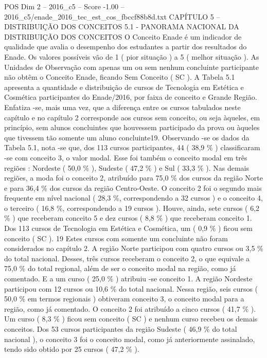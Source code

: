 \begin{textsample}{POS Dim 2 – 2016\_c5 – Score -1.00 – 2016\_c5/enade\_2016\_tec\_est\_cos\_fbccf88b8d.txt}  \label{ex:f2_pos_396}
CAPÍTULO 5 – DISTRIBUIÇÃO DOS CONCEITOS 5.1 - PANORAMA NACIONAL DA DISTRIBUIÇÃO DOS CONCEITOS O Conceito Enade é um indicador de qualidade que avalia o desempenho dos estudantes a partir dos resultados do Enade.
Os valores possíveis vão de 1 ( pior situação ) a 5 ( melhor situação ).
As Unidades de Observação com apenas um ou sem nenhum concluinte participante não obtêm o Conceito Enade, ficando Sem Conceito ( SC ).
A Tabela 5.1 apresenta a quantidade e distribuição de cursos de Tecnologia em Estética e Cosmética participantes do Enade/2016, por faixa de conceito e Grande Região.
Enfatiza -se, mais uma vez, que a diferença entre os cursos tabulados neste capítulo e no capítulo 2 corresponde aos cursos sem conceito, ou seja àqueles, em princípio, sem alunos concluintes que houvessem participado da prova ou àqueles que tivessem tão somente um aluno concluinte19.
Observando -se os dados da Tabela 5.1, nota -se que, dos 113 cursos participantes, 44 ( 38,9 \% ) classificaram -se com conceito 3, o valor modal.
Esse foi também o conceito modal em três regiões : Nordeste ( 50,0 \% ), Sudeste ( 47,2 \% ) e Sul ( 33,3 \% ).
Nas demais regiões, a moda foi o conceito 2, atribuído para 75,0 \% dos cursos da região Norte e para 36,4 \% dos cursos da região Centro-Oeste.
O conceito 2 foi o segundo mais frequente em nível nacional ( 28,3 \%, correspondendo a 32 cursos ) e o conceito 4, o terceiro ( 16,8 \%, correspondendo a 19 cursos ).
Houve, ainda, sete cursos ( 6,2 \% ) que receberam conceito 5 e dez cursos ( 8,8 \% ) que receberam conceito 1.
Dos 113 cursos de Tecnologia em Estética e Cosmética, um ( 0,9 \% ) ficou sem conceito ( SC ). 19 Estes cursos com somente um concluinte não foram considerados no capítulo 2.
A região Norte participou com quatro cursos ou 3,5 \% do total nacional.
Desses, três cursos receberam o conceito 2, o que equivale a 75,0 \% do total regional, além de ser o conceito modal na região, como já comentado.
E a um curso ( 25,0 \% ) atribuiu -se conceito 1.
A região Nordeste participou com 12 cursos ou 10,6 \% do total nacional.
Nessa região, seis cursos ( 50,0 \% em termos regionais ) obtiveram conceito 3, o conceito modal para a região, como já comentado.
O conceito 2 foi atribuído a cinco cursos ( 41,7 \% ).
Um curso ( 8,3 \% ) ficou sem conceito ( SC ) e nenhum curso recebeu os demais conceitos.
Dos 53 cursos participantes da região Sudeste ( 46,9 \% do total nacional ), o conceito 3 foi o conceito modal, como já anteriormente assinalado, tendo sido obtido por 25 cursos ( 47,2 \% ).

\end{textsample}
